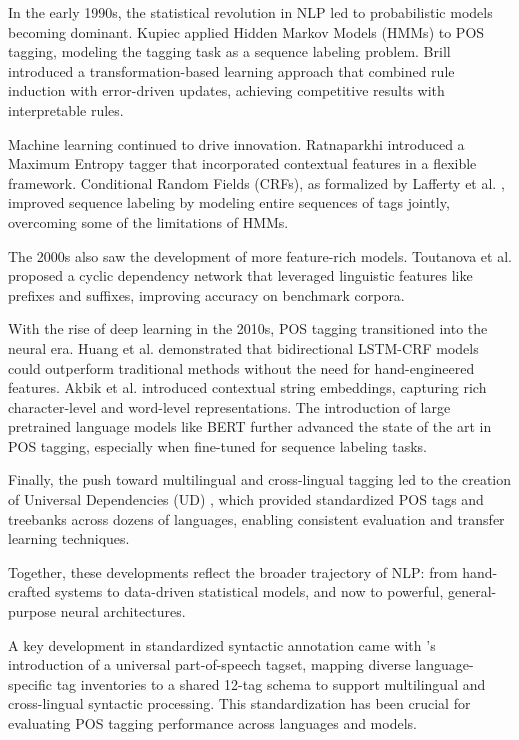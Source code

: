 In the early 1990s, the statistical revolution in NLP led to probabilistic models becoming dominant. Kupiec \cite{kupiec1992robust} applied Hidden Markov Models (HMMs) to POS tagging, modeling the tagging task as a sequence labeling problem. Brill \cite{brill1995transformation} introduced a transformation-based learning approach that combined rule induction with error-driven updates, achieving competitive results with interpretable rules.

Machine learning continued to drive innovation. Ratnaparkhi \cite{ratnaparkhi1996maximum} introduced a Maximum Entropy tagger that incorporated contextual features in a flexible framework. Conditional Random Fields (CRFs), as formalized by Lafferty et al. \cite{lafferty2001conditional}, improved sequence labeling by modeling entire sequences of tags jointly, overcoming some of the limitations of HMMs.

The 2000s also saw the development of more feature-rich models. Toutanova et al. \cite{toutanova2003feature} proposed a cyclic dependency network that leveraged linguistic features like prefixes and suffixes, improving accuracy on benchmark corpora.

With the rise of deep learning in the 2010s, POS tagging transitioned into the neural era. Huang et al. \cite{huang2015bidirectional} demonstrated that bidirectional LSTM-CRF models could outperform traditional methods without the need for hand-engineered features. Akbik et al. \cite{akbik2018contextual} introduced contextual string embeddings, capturing rich character-level and word-level representations. The introduction of large pretrained language models like BERT \cite{devlin2019bert} further advanced the state of the art in POS tagging, especially when fine-tuned for sequence labeling tasks.

Finally, the push toward multilingual and cross-lingual tagging led to the creation of Universal Dependencies (UD) \cite{nivre2016universal}, which provided standardized POS tags and treebanks across dozens of languages, enabling consistent evaluation and transfer learning techniques.

Together, these developments reflect the broader trajectory of NLP: from hand-crafted systems to data-driven statistical models, and now to powerful, general-purpose neural architectures.


A key development in standardized syntactic annotation came with \citet{petrov2012universal}'s introduction of a universal part-of-speech tagset, mapping diverse language-specific tag inventories to a shared 12-tag schema to support multilingual and cross-lingual syntactic processing. This standardization has been crucial for evaluating POS tagging performance across languages and models.

